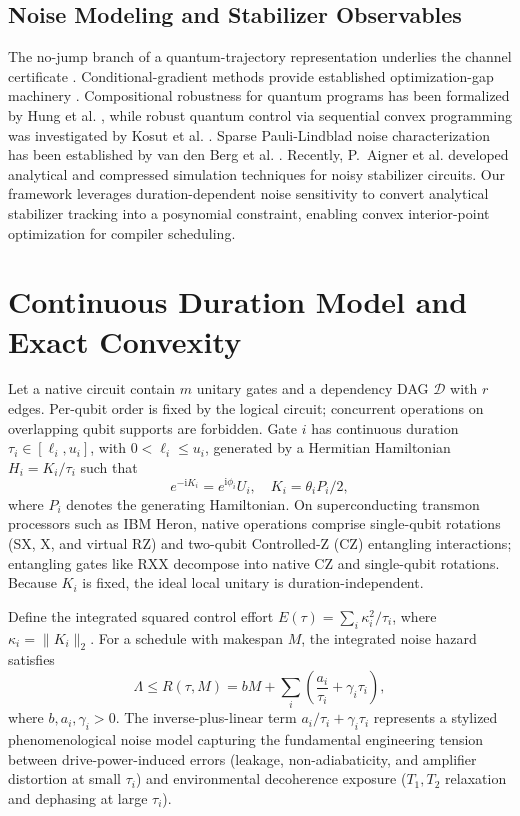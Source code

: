 \documentclass[10pt,letterpaper,journal]{IEEEtran}
\begin{document}
\subsection{Noise Modeling and Stabilizer Observables}
The no-jump branch of a quantum-trajectory representation underlies the channel certificate \cite{dalibard}. Conditional-gradient methods provide established optimization-gap machinery \cite{jaggi}. Compositional robustness for quantum programs has been formalized by Hung et al. \cite{hung}, while robust quantum control via sequential convex programming was investigated by Kosut et al. \cite{kosut}. Sparse Pauli-Lindblad noise characterization has been established by van den Berg et al. \cite{vandenberg}. Recently, P.~Aigner et al. \cite{aigner} developed analytical and compressed simulation techniques for noisy stabilizer circuits. Our framework leverages duration-dependent noise sensitivity to convert analytical stabilizer tracking into a posynomial constraint, enabling convex interior-point optimization for compiler scheduling.

\section{Continuous Duration Model and Exact Convexity}
Let a native circuit contain $m$ unitary gates and a dependency DAG $\mathcal{D}$ with $r$ edges. Per-qubit order is fixed by the logical circuit; concurrent operations on overlapping qubit supports are forbidden. Gate $i$ has continuous duration $\tau_i \in [\ell_i, u_i]$, with $0 < \ell_i \le u_i$, generated by a Hermitian Hamiltonian $H_i = K_i / \tau_i$ such that
\begin{equation}
e^{-\mathrm{i}K_i} = e^{\mathrm{i}\phi_i}U_i, \quad K_i = \theta_i P_i / 2,
\end{equation}
where $P_i$ denotes the generating Hamiltonian. On superconducting transmon processors such as IBM Heron, native operations comprise single-qubit rotations (SX, X, and virtual RZ) and two-qubit Controlled-Z (CZ) entangling interactions; entangling gates like RXX decompose into native CZ and single-qubit rotations. Because $K_i$ is fixed, the ideal local unitary is duration-independent.

Define the integrated squared control effort $E(\tau) = \sum_i \kappa_i^2 / \tau_i$, where $\kappa_i = \|K_i\|_2$. For a schedule with makespan $M$, the integrated noise hazard satisfies
\begin{equation}\label{eq:risk_model}
\Lambda \le R(\tau, M) = bM + \sum_i \left( \frac{a_i}{\tau_i} + \gamma_i \tau_i \right),
\end{equation}
where $b, a_i, \gamma_i > 0$. The inverse-plus-linear term $a_i/\tau_i + \gamma_i\tau_i$ represents a stylized phenomenological noise model capturing the fundamental engineering tension between drive-power-induced errors (leakage, non-adiabaticity, and amplifier distortion at small $\tau_i$) and environmental decoherence exposure ($T_1, T_2$ relaxation and dephasing at large $\tau_i$).
\end{document}
